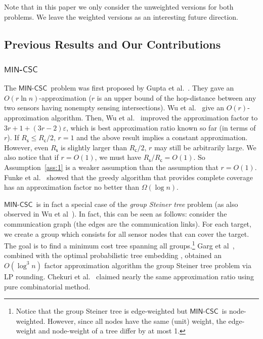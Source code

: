 \documentclass[11pt]{article}
\newcommand{\rednote}[1]{#1}
\newcommand{\mincsc}{$\mathsf{MIN}$-$\mathsf{CSC}$}
\newcommand{\Rc}{R_\mathsf{c}}
\newcommand{\Rs}{R_\mathsf{s}}
\begin{document}
\rednote{Note that in this paper we only consider the unweighted versions for both problems. 
	We leave the weighted versions as an interesting future direction.}

\vspace{-0.3cm}
\subsection{Previous Results and Our Contributions}


\subsubsection{\mincsc}
The \mincsc\ problem was first proposed by Gupta et al.~\cite{gupta2006connected}.
They gave an $O(r\ln n)$-approximation
($r$ is an upper bound of the hop-distance between any two sensors
having nonempty sensing intersections).
Wu et al.~\cite{wu2013approximations} give an $O(r)$-approximation algorithm.
\rednote{Then, Wu et al.~\cite{wu2016connected} improved the approximation factor to $3r+1+(3r-2)\varepsilon$, which is best approximation ratio known so far (in terms of $r$).}
If $\Rs\leq \Rc/2$, $r=1$ and the above result implies a constant approximation.
However, even
$\Rs$ is slightly larger than $\Rc/2$, $r$ may still be  arbitrarily large.
We also notice that if $r=O(1)$, we must have $\Rs/\Rc= O(1)$.
So Assumption~\ref{ass:1} is a weaker assumption than the assumption that $r=O(1)$.
\rednote{Funke et al.~\cite{funke2007improved} showed that the greedy algorithm that provides complete coverage has an approximation factor no better than $\Omega(\log n)$.}

\mincsc\ is in fact a special case of the {\em group Steiner tree} problem
(as also observed in Wu et al~\cite{wu2013approximations,wu2016minimum}).
In fact, this can be seen as follows:
consider the communication graph (the edges are the communication links).
For each target, we create a group which consists for all sensor nodes that can cover the
target. The goal is to find a minimum cost tree spanning all groups.\footnote{
	Notice that the group Steiner tree is edge-weighted but \mincsc\ is node-weighted.
	However, since all nodes have the same (unit) weight, the edge-weight and node-weight of a tree differ by at most 1.
}
Garg et al~\cite{garg1998polylogarithmic}, combined with the optimal
probabilistic tree embedding \cite{fakcharoenphol2003tight}, \rednote{obtained} an $O(\log^{3}n)$ factor approximation algorithm the group Steiner tree problem via LP rounding.  Chekuri et al.~\cite{chekuri2006greedy} \rednote{claimed} nearly the same approximation ratio using pure combinatorial method.
\end{document}
